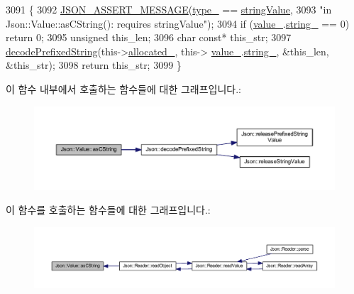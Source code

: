 \begin{DoxyCode}
3091                                    \{
3092   \hyperlink{json_8h_ad7facdeeca0f495765e3b204c265eadb}{JSON\_ASSERT\_MESSAGE}(\hyperlink{class_json_1_1_value_abd222c2536dc88bf330dedcd076d2356}{type\_} == \hyperlink{namespace_json_a7d654b75c16a57007925868e38212b4ea804ef857affea2d415843c73f261c258}{stringValue},
3093                       \textcolor{stringliteral}{"in Json::Value::asCString(): requires stringValue"});
3094   \textcolor{keywordflow}{if} (\hyperlink{class_json_1_1_value_aef578244546212705b9f81eb84d7e151}{value\_}.\hyperlink{union_json_1_1_value_1_1_value_holder_a70ac2b153bc405527baa3850d2ddc3cb}{string\_} == 0) \textcolor{keywordflow}{return} 0;
3095   \textcolor{keywordtype}{unsigned} this\_len;
3096   \textcolor{keywordtype}{char} \textcolor{keyword}{const}* this\_str;
3097   \hyperlink{namespace_json_aad8b4982c1acd164f541fba396ac9fb1}{decodePrefixedString}(this->\hyperlink{class_json_1_1_value_ae0126c80dc4907aad94088553fc7632b}{allocated\_}, this->
      \hyperlink{class_json_1_1_value_aef578244546212705b9f81eb84d7e151}{value\_}.\hyperlink{union_json_1_1_value_1_1_value_holder_a70ac2b153bc405527baa3850d2ddc3cb}{string\_}, &this\_len, &this\_str);
3098   \textcolor{keywordflow}{return} this\_str;
3099 \}
\end{DoxyCode}
이 함수 내부에서 호출하는 함수들에 대한 그래프입니다.\+:\nopagebreak
\begin{figure}[H]
\begin{center}
\leavevmode
\includegraphics[width=350pt]{class_json_1_1_value_a16668c8db7ef0a5de040012f0dfd84b0_cgraph}
\end{center}
\end{figure}
이 함수를 호출하는 함수들에 대한 그래프입니다.\+:\nopagebreak
\begin{figure}[H]
\begin{center}
\leavevmode
\includegraphics[width=350pt]{class_json_1_1_value_a16668c8db7ef0a5de040012f0dfd84b0_icgraph}
\end{center}
\end{figure}
\mbox{\label{class_json_1_1_value_afd24002a18aef907ad746b1cb9eda0a2}} 
